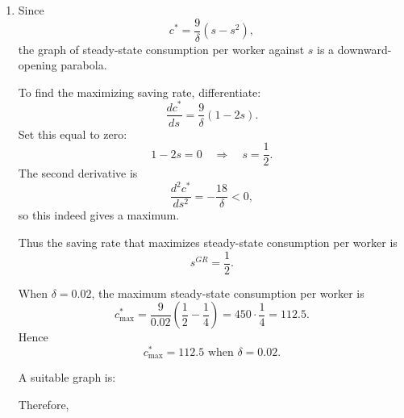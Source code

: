 \documentclass[12pt]{article}
\begin{document}
\begin{enumerate}[label=(\alph*)]
    Therefore,
    \[
    \boxed{
    \begin{array}{c|cccc}
    s & 0 & 0.1 & 0.2 & 1 \\ \hline
    y^* & 0 & 45 & 90 & 450 \\
    c^* & 0 & 40.5 & 72 & 0
    \end{array}}
    \]

    We observe that steady-state output per worker rises with the saving rate, but steady-state consumption per worker does not. Consumption is zero when \(s=0\) and also zero when \(s=1\), so it must rise at first and then fall.

    \item
    Since
    \[
    c^*=\frac{9}{\delta}(s-s^2),
    \]
    the graph of steady-state consumption per worker against \(s\) is a downward-opening parabola.

    To find the maximizing saving rate, differentiate:
    \[
    \frac{dc^*}{ds}
    =\frac{9}{\delta}(1-2s).
    \]
    Set this equal to zero:
    \[
    1-2s=0
    \quad\Longrightarrow\quad
    s=\frac12.
    \]
    The second derivative is
    \[
    \frac{d^2c^*}{ds^2}=-\frac{18}{\delta}<0,
    \]
    so this indeed gives a maximum.

    Thus the saving rate that maximizes steady-state consumption per worker is
    \[
    \boxed{s^{GR}=\frac12.}
    \]

    When \(\delta=0.02\), the maximum steady-state consumption per worker is
    \[
    c^*_{\max}
    =\frac{9}{0.02}\left(\frac12-\frac14\right)
    =450\cdot \frac14
    =112.5.
    \]
    Hence
    \[
    \boxed{c^*_{\max}=112.5 \text{ when } \delta=0.02.}
    \]

    A suitable graph is:

    \begin{center}
    \end{center}

    Therefore,
    \begin{center}
    \end{center}
\end{enumerate}
\end{document}

